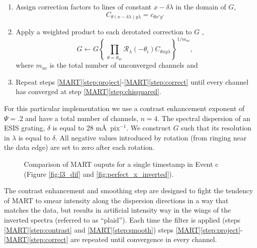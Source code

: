 \begin{enumerate}
		\item Assign correction factors to lines of constant $x-\delta\lambda$ in the domain of $G$,
			\begin{equation}
				C_{\theta (x-\delta\lambda)y\lambda} = c_{\theta x'y'}
			\end{equation}	
		
		\item \label{step:correct} Apply a weighted product to each derotated correction to $G$ ,
			\begin{equation}\label{eq:correct}
				G \leftarrow G\left\lbrace  \,\prod_{\theta=\theta_{uc}}  \mathcal{R}_\lambda(-\theta_i)C_{\theta xy\lambda} \right\rbrace^{1/m_{uc}},
			\end{equation}
		where $m_{uc}$ is the total number of unconverged channels and 
		
		\item Repeat steps \ref{MART}\ref{step:project}-\ref{MART}\ref{step:correct}
		until every channel has converged at step \ref{MART}\ref{step:chisquared}.
	\end{enumerate}
		For this particular implementation we use a contrast enhancement exponent of $\Psi = .2$ and have a total number of channels, $n=4$.
		The spectral dispersion of an ESIS grating, $\delta$ is equal to 28 m\AA\ pix$^{-1}$. 
		We construct $G$ such that its resolution in $\lambda$ is equal to $\delta$.
		All negative values introduced by rotation (from ringing near the data edge) are set to zero after each rotation.
		
		\begin{figure}[htb!]
			\centering
			\caption{Comparison of MART ouputs for a single timestamp in Event c (Figure \ref{fig:l3_dif} and \ref{fig:perfect_x_inverted}).}
			\label{fig:perfect_x_invertcomp}
		\end{figure}
		
		
		The contrast enhancement and smoothing step are designed to fight the tendency of MART to smear intensity along the dispersion directions in a way that matches the data, but results in artificial intensity way in the wings of the inverted spectra (referred to as ``plaid'').
		Each time the filter is applied (steps \ref{MART}\ref{step:contrast} and \ref{MART}\ref{step:smooth}) steps \ref{MART}\ref{step:project}-\ref{MART}\ref{step:correct} are repeated until convergence in every channel.
		
